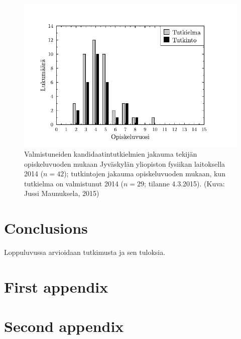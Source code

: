 \documentclass[final]{thesis} %
\begin{document}
\begin{figure}[htp]
   \centering
   \includegraphics[width=\textwidth]{mallikuvio}
   \caption{Valmistuneiden kandidaatintutkielmien jakauma tekijän opiskeluvuoden mukaan Jyväskylän yliopiston fysiikan laitoksella 2014 ($n = 42$); tutkintojen jakauma opiskeluvuoden mukaan, kun tutkielma on valmistunut 2014 ($n = 29$; tilanne 4.3.2015). (Kuva: Jussi Maunuksela, 2015)}
   \label{fig:esim-kuvio}
\end{figure}

\section{Conclusions}
\label{sec:conclusions}

Loppuluvussa arvioidaan tutkimusta ja sen tuloksia. \lipsum[1]

\lipsum[2-3]

\nocite{*}

\printbibliography

\appendix

\section{First appendix}
\label{sec:first-appendix}

\lipsum[2-3]

\section{Second appendix}
\label{sec:second-appendix}

\lipsum[2-3]
\end{document}
